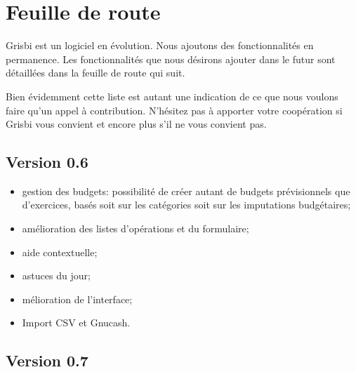

\chapter{Feuille de route\label{todo} }

Grisbi est un logiciel en évolution. Nous ajoutons des fonctionnalités en permanence.  Les fonctionnalités que nous désirons ajouter dans le futur sont détaillées dans la feuille de route qui suit.

Bien évidemment cette liste est autant une indication de ce que nous voulons faire qu'un appel à contribution.  N'hésitez pas à apporter votre coopération si Grisbi vous convient et encore plus s'il ne vous convient pas.


\section{Version 0.6}

\begin{itemize}
	\item gestion des budgets: possibilité de créer autant de budgets prévisionnels 	que d'exercices, basés soit sur les catégories soit sur les imputations budgétaires;	
	\item amélioration des listes d'opérations et du formulaire;	
	\item aide contextuelle;	
	\item astuces du jour;	
	\item mélioration de l'interface;	
	\item Import CSV et Gnucash.
\end{itemize}


\section{Version 0.7}

